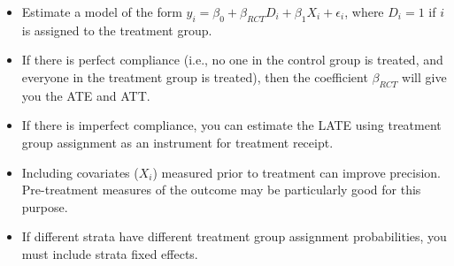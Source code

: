 \documentclass[10pt,a4paper]{protocol}
\begin{document}
\begin{itemize}
	\item Estimate a model of the form $y_{i}=\beta_0 + \beta_{RCT} D_i + \beta_1 X_i + \epsilon_i$, where $D_i=1$ if $i$ is assigned to the treatment group.
	\item If there is perfect compliance (i.e., no one in the control group is treated, and everyone in the treatment group is treated), then the coefficient $\beta_{RCT}$ will give you the ATE and ATT.
	\item If there is imperfect compliance, you can estimate the LATE using treatment group assignment as an instrument for treatment receipt.
	\item Including covariates ($X_i$) measured prior to treatment can improve precision. Pre-treatment measures of the outcome may be particularly good for this purpose.
	\item If different strata have different treatment group assignment probabilities, you must include strata fixed effects.
\end{itemize}
\divider



\clearpage


\nocite{*}

\printbibliography


\divider


\end{document}

